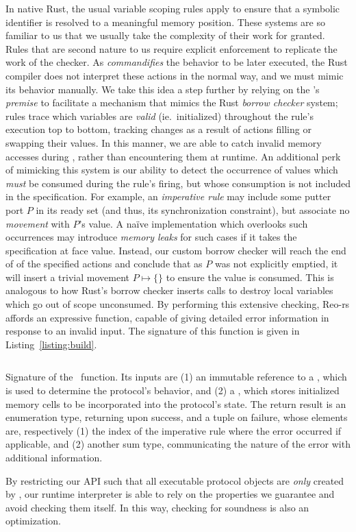 In native Rust, the usual variable scoping rules apply to ensure that a symbolic identifier is resolved to a meaningful memory position. These systems are so familiar to us that we usually take the complexity of their work for granted. Rules that are second nature to us require explicit enforcement to replicate the work of the checker. As  \textit{commandifies} the behavior to be later executed, the Rust compiler does not interpret these actions in the normal way, and we must mimic its behavior manually. We take this idea a step further by relying on the 's \textit{premise} to facilitate a mechanism that mimics the Rust \textit{borrow checker} system; rules trace which variables are \textit{valid} (ie.\ initialized) throughout the rule's execution top to bottom, tracking changes as a result of actions filling or swapping their values. In this manner, we are able to catch invalid memory accesses during , rather than encountering them at runtime. An additional perk of mimicking this system is our ability to detect the occurrence of values which \textit{must} be consumed during the rule's firing, but whose consumption is not included in the specification. For example, an \textit{imperative rule} may include some putter port $P$ in its ready set (and thus, its synchronization constraint), but associate no \textit{movement} with $P$'s value. A na\"ive implementation which overlooks such occurrences may introduce \textit{memory leaks} for such cases if it takes the specification at face value. Instead, our custom borrow checker will reach the end of of the specified actions and conclude that as $P$ was not explicitly emptied, it will insert a trivial movement $P\mapsto{} \{\}$ to ensure the value is consumed. This is analogous to how Rust's borrow checker inserts  calls to destroy local variables which go out of scope unconsumed. By performing this extensive checking, Reo-rs affords an expressive  function, capable of giving detailed error information in response to an invalid input. The signature of this function is given in Listing~\ref{listing:build}.


\begin{listing}[ht]
	\centering
	\inputminted[]{rust}{build.rs}
	\caption[TODO.]{Signature of the~ function. Its inputs are (1) an immutable reference to a , which is used to determine the protocol's behavior, and (2) a , which stores initialized memory cells to be incorporated into the protocol's state. The return result is an enumeration type, returning  upon success, and a tuple on failure, whose elements are, respectively (1) the index of the imperative rule where the error occurred if applicable, and (2) another sum type, communicating the nature of the error with additional information. }
	\label{listing:build}
\end{listing}

By restricting our API such that all executable protocol objects are \textit{only} created by , our runtime interpreter is able to rely on the properties we guarantee and avoid checking them itself. In this way, checking for soundness is also an optimization.

